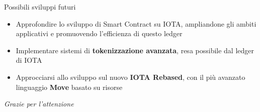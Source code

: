 \documentclass[xcolor=dvipsnames]{beamer}
\begin{document}
\begin{frame}{Possibili sviluppi futuri}
    \linespread{1.5}
    \begin{itemize}
        \item Approfondire lo sviluppo di Smart Contract su IOTA, ampliandone gli ambiti applicativi e promuovendo l'efficienza di questo ledger
        \vfill
        \item Implementare sistemi di \textbf{tokenizzazione avanzata}, resa possibile dal ledger di IOTA
        \vfill
        \item Approcciarsi allo sviluppo sul nuovo \textbf{IOTA Rebased}, con il più avanzato linguaggio \textbf{Move} basato su risorse
    \end{itemize}
\end{frame}

\begin{frame}[noframenumbering]
    \centering \Large
    \emph{Grazie per l'attenzione}
\end{frame}
\end{document}
